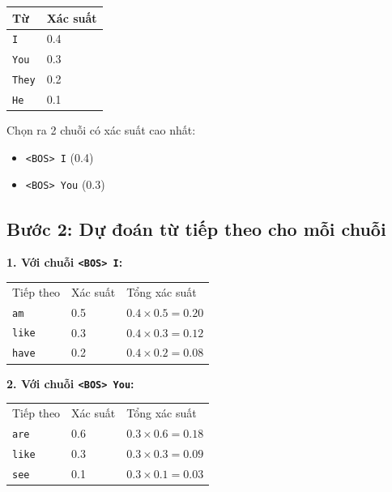 \documentclass{book}
\begin{document}
        \begin{center}
        \begin{tabular}{ll}
        \toprule
        Từ & Xác suất \\
        \midrule
        \texttt{I}     & 0.4 \\
        \texttt{You}   & 0.3 \\
        \texttt{They}  & 0.2 \\
        \texttt{He}    & 0.1 \\
        \bottomrule
        \end{tabular}
        \end{center}
        
        Chọn ra 2 chuỗi có xác suất cao nhất:
        \begin{itemize}
            \item \texttt{<BOS> I} \hfill (0.4)
            \item \texttt{<BOS> You} \hfill (0.3)
        \end{itemize}
        
        \subsection*{Bước 2: Dự đoán từ tiếp theo cho mỗi chuỗi}
        
        \textbf{1. Với chuỗi \texttt{<BOS> I}:}
        
        \begin{center}
        \begin{tabular}{lll}
        Tiếp theo & Xác suất & Tổng xác suất \\
        \texttt{am}     & 0.5 & $0.4 \times 0.5 = 0.20$ \\
        \texttt{like}   & 0.3 & $0.4 \times 0.3 = 0.12$ \\
        \texttt{have}   & 0.2 & $0.4 \times 0.2 = 0.08$ \\
        \end{tabular}
        \end{center}
        
        \textbf{2. Với chuỗi \texttt{<BOS> You}:}
        
        \begin{center}
        \begin{tabular}{lll}
        Tiếp theo & Xác suất & Tổng xác suất \\
        \texttt{are}     & 0.6 & $0.3 \times 0.6 = 0.18$ \\
        \texttt{like}    & 0.3 & $0.3 \times 0.3 = 0.09$ \\
        \texttt{see}     & 0.1 & $0.3 \times 0.1 = 0.03$ \\
        \end{tabular}
        \end{center}
        
\end{document}
